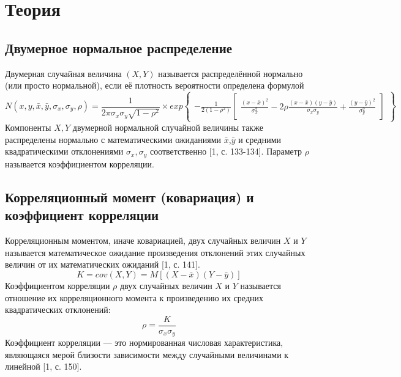 \documentclass[a4paper,14pt]{article}
\begin{document}
	\section{Теория}
	\subsection{Двумерное нормальное распределение}
	\noindent Двумерная случайная величина $(X,Y)$ называется распределённой нормально (или просто нормальной), если её плотность вероятности определена формулой
	\begin{equation}
		N(x, y, \bar{x}, \bar{y}, \sigma_{x}, \sigma_{y}, \rho) = 
		\frac{1}{2\pi\sigma_{x}\sigma_{y}\sqrt{1-\rho^{2}}} \times
		exp{\begin{Bmatrix}
				-\frac{1}{2(1-\rho^{2})}
				\begin{bmatrix}
					\frac{(x-\bar{x})^{2}}{\sigma_{x}^{2}} - 2\rho\frac{(x-\bar{x})(y-\bar{y})}{\sigma_{x}\sigma_{y}} + \frac{(y-\bar{y})^{2}}{\sigma_{y}^{2}}
				\end{bmatrix}
		\end{Bmatrix}}
	\end{equation}
	Компоненты $X,Y$ двумерной нормальной случайной величины также распределены нормально с математическими ожиданиями $\bar{x}$,$\bar{y}$ и средними квадратическими отклонениями $\sigma_{x},\sigma_{y}$ соответственно [1, с. 133-134].
	Параметр $\rho$ называется коэффициентом корреляции.
	
	
	\subsection{Корреляционный момент (ковариация) и коэффициент корреляции}
	\noindent Корреляционным моментом, иначе ковариацией, двух случайных величин $X$ и $Y$ называется математическое ожидание произведения отклонений этих случайных величин от их математических ожиданий [1, с. 141].
	\begin{equation}
		K = cov(X, Y) = M[(X - \bar{x})(Y - \bar{y})]
		\label{K}
	\end{equation}
	Коэффициентом корреляции $\rho$ двух случайных величин $X$ и $Y$ называется отношение их корреляционного момента к произведению их средних квадратических отклонений:
	\begin{equation}
		\rho = \frac{K}{\sigma_{x}\sigma_{y}}
		\label{ro}
	\end{equation}
	Коэффициент корреляции — это нормированная числовая характеристика, являющаяся мерой близости зависимости между случайными величинами к линейной [1, с. 150].
	
\end{document}
